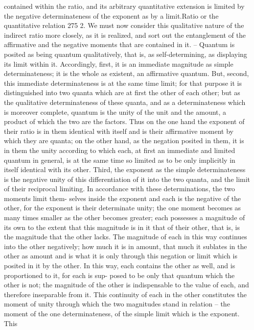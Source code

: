 contained within the ratio, and its arbitrary quantitative extension is limited
by the negative determinateness of the exponent as by a limit.Ratio or the quantitative relation
275
2. We must now consider this qualitative nature of the indirect ratio more
closely, as it is realized, and sort out the entanglement of the affirmative
and the negative moments that are contained in it. – Quantum is posited
as being quantum qualitatively, that is, as self-determining, as displaying
its limit within it. Accordingly, first, it is an immediate magnitude as simple
determinateness; it is the whole as existent, an affirmative quantum. But,
second, this immediate determinateness is at the same time limit; for that
purpose it is distinguished into two quanta which are at first the other of
each other; but as the qualitative determinateness of these quanta, and as
a determinateness which is moreover complete, quantum is the unity of
the unit and the amount, a product of which the two are the factors. Thus
on the one hand the exponent of their ratio is in them identical with itself
and is their affirmative moment by which they are quanta; on the other
hand, as the negation posited in them, it is in them the unity according
to which each, at first an immediate and limited quantum in general, is at
the same time so limited as to be only implicitly in itself identical with its
other. Third, the exponent as the simple determinateness is the negative
unity of this differentiation of it into the two quanta, and the limit of their
reciprocal limiting.
In accordance with these determinations, the two moments limit them-
selves inside the exponent and each is the negative of the other, for the
exponent is their determinate unity; the one moment becomes as many
times smaller as the other becomes greater; each possesses a magnitude of
its own to the extent that this magnitude is in it that of their other, that
is, is the magnitude that the other lacks. The magnitude of each in this
way continues into the other negatively; how much it is in amount, that
much it sublates in the other as amount and is what it is only through
this negation or limit which is posited in it by the other. In this way,
each contains the other as well, and is proportioned to it, for each is sup-
posed to be only that quantum which the other is not; the magnitude of
the other is indispensable to the value of each, and therefore inseparable
from it.
This continuity of each in the other constitutes the moment of unity
through which the two magnitudes stand in relation – the moment of
the one determinateness, of the simple limit which is the exponent. This

